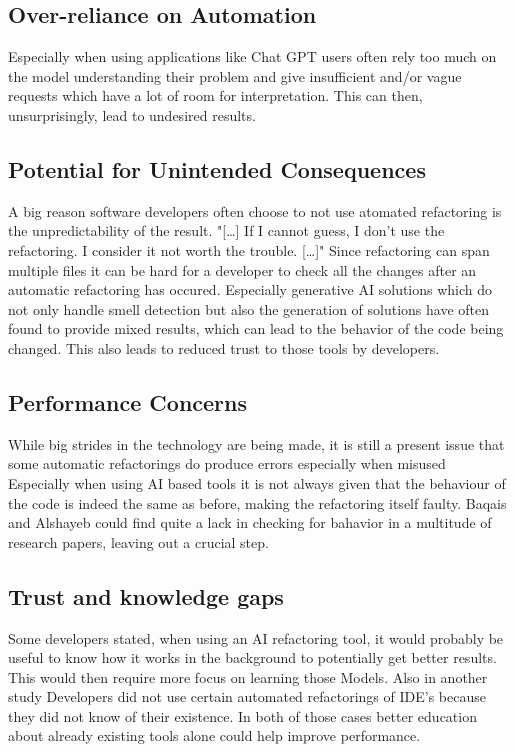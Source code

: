 \subsection{Over-reliance on Automation}
Especially when using applications like Chat GPT users often rely too much on the model understanding their problem and give insufficient and/or vague requests which have a lot of room for interpretation. This can then, unsurprisingly, lead to undesired results. \cite{alomar2024refactor}

\subsection{Potential for Unintended Consequences}
A big reason software developers often choose to not use atomated refactoring is the unpredictability of the result. 
"[…] If I cannot guess, I don't use the refactoring. I consider it not worth the trouble. […]" \cite{usedisuserefactor} Since refactoring can span multiple files it can be hard for a developer to check all the changes after an automatic refactoring has occured.
Especially generative AI solutions which do not only handle smell detection but also the generation of solutions have often found to provide mixed results, which can lead to the behavior of the code being changed. This also leads to reduced trust to those tools by developers. \cite{10.1145/3397481.3450656}

\subsection{Performance Concerns}
While big strides in the technology are being made, it is still a present issue that some automatic refactorings do produce errors especially when misused \cite{7833023} 
Especially when using AI based tools it is not always given that the behaviour of the code is indeed the same as before, making the refactoring itself faulty. Baqais and Alshayeb could find quite a lack in checking for bahavior in a multitude of research papers, leaving out a crucial step. \cite{baqais2020automatic}

\subsection{Trust and knowledge gaps}
Some developers stated, when using an AI refactoring tool, it would probably be useful to know how it works in the background to potentially get better results. \cite{10.1145/3397481.3450656}
This would then require more focus on learning those Models. Also in another study Developers did not use certain automated refactorings of IDE's because they did not know of their existence. \cite{negara2013comparative}
In both of those cases better education about already existing tools alone could help improve performance.
